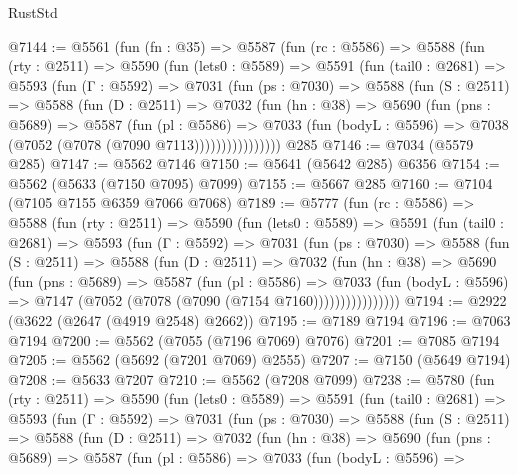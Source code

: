 \begin{lexlean}{RustStd}
\begin{coremodule}
@7144 := @5561
    (fun (fn : @35) =>
    @5587
      (fun (rc : @5586) =>
      @5588
        (fun (rty : @2511) =>
        @5590
          (fun (lets0 : @5589) =>
          @5591
            (fun (tail0 : @2681) =>
            @5593
              (fun (Γ : @5592) =>
              @7031
                (fun (ps : @7030) =>
                @5588
                  (fun (S : @2511) =>
                  @5588
                    (fun (D : @2511) =>
                    @7032
                      (fun (hn : @38) =>
                      @5690
                        (fun (pns : @5689) =>
                        @5587
                          (fun (pl : @5586) =>
                          @7033
                            (fun (bodyL : @5596) => @7038 (@7052 (@7078 (@7090 @7113))))))))))))))))
    @285
@7146 := @7034 (@5579 @285)
@7147 := @5562 @7146
@7150 := @5641 (@5642 @285) @6356
@7154 := @5562 (@5633 (@7150 @7095) @7099)
@7155 := @5667 @285
@7160 := @7104 (@7105 @7155 @6359 @7066 @7068)
@7189 := @5777
    (fun (rc : @5586) =>
    @5588
      (fun (rty : @2511) =>
      @5590
        (fun (lets0 : @5589) =>
        @5591
          (fun (tail0 : @2681) =>
          @5593
            (fun (Γ : @5592) =>
            @7031
              (fun (ps : @7030) =>
              @5588
                (fun (S : @2511) =>
                @5588
                  (fun (D : @2511) =>
                  @7032
                    (fun (hn : @38) =>
                    @5690
                      (fun (pns : @5689) =>
                      @5587
                        (fun (pl : @5586) =>
                        @7033
                          (fun (bodyL : @5596) =>
                          @7147 (@7052 (@7078 (@7090 (@7154 @7160))))))))))))))))
@7194 := @2922 (@3622 (@2647 (@4919 @2548) @2662))
@7195 := @7189 @7194
@7196 := @7063 @7194
@7200 := @5562 (@7055 (@7196 @7069) @7076)
@7201 := @7085 @7194
@7205 := @5562 (@5692 (@7201 @7069) @2555)
@7207 := @7150 (@5649 @7194)
@7208 := @5633 @7207
@7210 := @5562 (@7208 @7099)
@7238 := @5780
    (fun (rty : @2511) =>
    @5590
      (fun (lets0 : @5589) =>
      @5591
        (fun (tail0 : @2681) =>
        @5593
          (fun (Γ : @5592) =>
          @7031
            (fun (ps : @7030) =>
            @5588
              (fun (S : @2511) =>
              @5588
                (fun (D : @2511) =>
                @7032
                  (fun (hn : @38) =>
                  @5690
                    (fun (pns : @5689) =>
                    @5587
                      (fun (pl : @5586) =>
                      @7033
                        (fun (bodyL : @5596) =>

\end{coremodule}
\end{lexlean}
